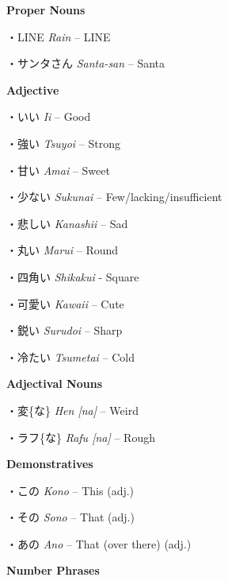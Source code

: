 \par{\textbf{Proper Nouns }}

\par{・LINE \emph{Rain }– LINE }

\par{・サンタさん \emph{Santa-san }– Santa }

\par{\textbf{Adjective }}

\par{・いい \emph{Ii }– Good }

\par{・強い \emph{Tsuyoi }– Strong }

\par{・甘い \emph{Amai }– Sweet }

\par{・少ない \emph{Sukunai }– Few\slash lacking\slash insufficient }

\par{・悲しい \emph{Kanashii }– Sad }

\par{・丸い \emph{Marui }– Round }

\par{・四角い \emph{Shikakui }- Square }

\par{・可愛い \emph{Kawaii }– Cute }

\par{・鋭い \emph{Surudoi }– Sharp }

\par{・冷たい \emph{Tsumetai }– Cold }

\par{\textbf{Adjectival Nouns }}

\par{・変\{な\} \emph{Hen [na] }– Weird }

\par{・ラフ\{な\} \emph{Rafu [na] }– Rough }

\par{\textbf{Demonstratives }}

\par{・この \emph{Kono }– This (adj.) }

\par{・その \emph{Sono }– That (adj.) }

\par{・あの \emph{Ano }– That (over there) (adj.) }

\par{\textbf{Number Phrases }}

